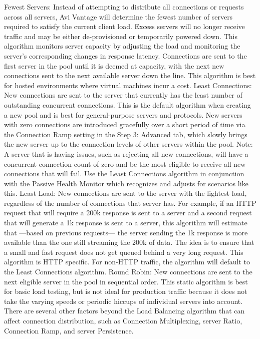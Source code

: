\documentclass[letterpaper,10pt,english]{sphinxmanual}
\begin{document}
Fewest Servers: Instead of attempting to distribute all connections or requests across all servers, Avi Vantage will determine the fewest number of servers required to satisfy the current client load. Excess servers will no longer receive traffic and may be either de-provisioned or temporarily powered down. This algorithm monitors server capacity by adjusting the load and monitoring the server’s corresponding changes in response latency. Connections are sent to the first server in the pool until it is deemed at capacity, with the next new connections sent to the next available server down the line. This algorithm is best for hosted environments where virtual machines incur a cost.
Least Connections: New connections are sent to the server that currently has the least number of outstanding concurrent connections. This is the default algorithm when creating a new pool and is best for general-purpose servers and protocols. New servers with zero connections are introduced gracefully over a short period of time via the Connection Ramp setting in the Step 3: Advanced tab, which slowly brings the new server up to the connection levels of other servers within the pool.
Note: A server that is having issues, such as rejecting all new connections, will have a concurrent connection count of zero and be the most eligible to receive all new connections that will fail. Use the Least Connections algorithm in conjunction with the Passive Health Monitor which recognizes and adjusts for scenarios like this.
Least Load: New connections are sent to the server with the lightest load, regardless of the number of connections that server has. For example, if an HTTP request that will require a 200k response is sent to a server and a second request that will generate a 1k response is sent to a server, this algorithm will estimate that —based on previous requests— the server sending the 1k response is more available than the one still streaming the 200k of data. The idea is to ensure that a small and fast request does not get queued behind a very long request. This algorithm is HTTP specific. For non-HTTP traffic, the algorithm will default to the Least Connections algorithm.
Round Robin: New connections are sent to the next eligible server in the pool in sequential order. This static algorithm is best for basic load testing, but is not ideal for production traffic because it does not take the varying speeds or periodic hiccups of individual servers into account.
There are several other factors beyond the Load Balancing algorithm that can affect connection distribution, such as Connection Multiplexing, server Ratio, Connection Ramp, and server Persistence.
\end{document}

